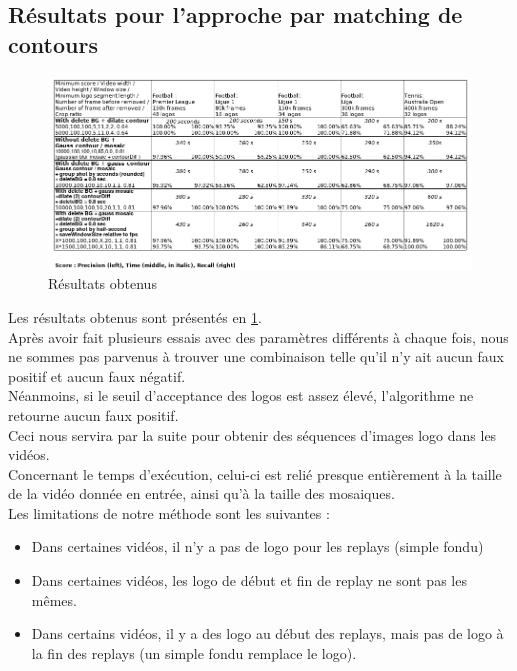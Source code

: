 \documentclass[11pt]{article}
\begin{document}
\subsection{Résultats pour l'approche par matching de contours}
\label{sec:org018aa08}
\begin{figure}[htbp]
\centering
\includegraphics[width=17cm]{res_match_contour.png}
\caption{Résultats obtenus \label{res-match-contour}}
\end{figure}
Les résultats obtenus sont présentés en \ref{res-match-contour}.\\

Après avoir fait plusieurs essais avec des paramètres différents à chaque fois, nous ne sommes pas parvenus à trouver une combinaison telle qu'il n'y ait aucun faux positif et aucun faux négatif.\\
Néanmoins, si le seuil d'acceptance des logos est assez élevé, l'algorithme ne retourne aucun faux positif.\\
Ceci nous servira par la suite pour obtenir des séquences d'images logo dans les vidéos.\\

Concernant le temps d’exécution, celui-ci est relié presque entièrement à la taille de la vidéo donnée en entrée, ainsi qu’à la taille des mosaiques.\\

Les limitations de notre méthode sont les suivantes :\\
\begin{itemize}
\item Dans certaines vidéos, il n’y a pas de logo pour les replays (simple fondu)\\
\item Dans certaines vidéos, les logo de début et fin de replay ne sont pas les mêmes.\\
\item Dans certains vidéos, il y a des logo au début des replays, mais pas de logo à la fin des replays (un simple fondu remplace le logo).\\
\end{itemize}
\end{document}
